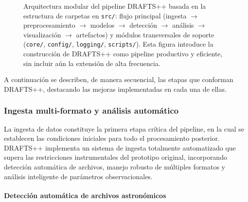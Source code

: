 \begin{figure}[H]
{}
\endgroup
\caption{Arquitectura modular del pipeline DRAFTS++ basada en la estructura de carpetas en \texttt{src/}: flujo principal (ingesta $\to$ preprocesamiento $\to$ modelos $\to$ detección $\to$ análisis $\to$ visualización $\to$ artefactos) y módulos transversales de soporte (\texttt{core/}, \texttt{config/}, \texttt{logging/}, \texttt{scripts/}). Esta figura introduce la construcción de DRAFTS++ como pipeline productivo y eficiente, sin incluir aún la extensión de alta frecuencia.}
\label{fig:workflow-src}
\end{figure}

A continuación se describen, de manera secuencial, las etapas que conforman DRAFTS++, destacando las mejoras implementadas en cada una de ellas.

\subsubsection{Ingesta multi-formato y análisis automático}

La ingesta de datos constituye la primera etapa crítica del pipeline, en la cual se establecen las condiciones iniciales para todo el procesamiento posterior. DRAFTS++ implementa un sistema de ingesta totalmente automatizado que supera las restricciones instrumentales del prototipo original, incorporando detección automática de archivos, manejo robusto de múltiples formatos y análisis inteligente de parámetros observacionales.


\paragraph{Detección automática de archivos astronómicos}

